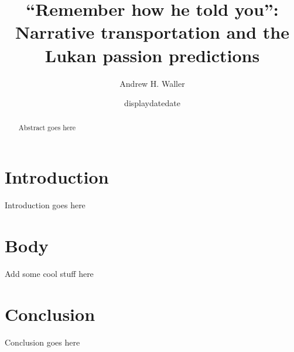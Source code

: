 \documentclass[12pt, letterpaper, titlepage]{article}
\title{\enquote{Remember how he told you}: Narrative transportation and the Lukan passion predictions}
\author{Andrew H. Waller}
\date{displaydate{date}}
\begin{document}
\maketitle
\begin{abstract}
  Abstract goes here
\end{abstract}
\section{Introduction}
  Introduction goes here
\section{Body}
  Add some cool stuff here
\section{Conclusion}
  Conclusion goes here
\pagebreak
\printbibliography
\end{document}

